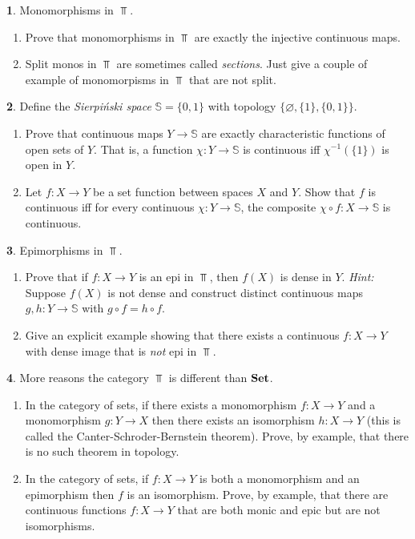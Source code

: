 \documentclass[11pt]{article}
\theoremstyle{definition}
\newtheorem{problem}{}
\newcommand{\bp}{\begin{problem}}
\newcommand{\ep}{\end{problem}\bigskip}
\theoremstyle{theorem}
\begin{document}
\begin{problem} Monomorphisms in $\Top$.
\begin{enumerate}[label=(\alph*)]
\item Prove that monomorphisms in $\Top$ are exactly the injective continuous maps.
\item Split monos in $\Top$ are sometimes called \emph{sections}.  Just give a couple of example  of monomorpisms in $\Top$ that are not split.
\end{enumerate}
\end{problem}

\bp Define the \emph{Sierpiński space} $\mathbb S=\{0,1\}$ with topology $\{\varnothing,\{1\},\{0,1\}\}$.  
\begin{enumerate}[label=(\alph*)]
\item Prove that continuous maps $Y\to\mathbb S$ are exactly characteristic functions of open sets of $Y$.  That is, a function $\chi:Y\to\mathbb S$ is continuous iff $\chi^{-1}(\{1\})$ is open in $Y$.
\item Let $f:X\to Y$ be a set function between spaces $X$ and $Y$. Show that $f$ is continuous iff for every continuous $\chi:Y\to\mathbb S$, the composite $\chi\circ f:X\to\mathbb S$ is continuous. 
\end{enumerate}
\ep 

\pagebreak

\begin{problem} Epimorphisms in $\Top$.
\begin{enumerate}[label=(\alph*)]
\item Prove that if $f:X\to Y$ is an epi in $\Top$, then $f(X)$ is dense in $Y$. \emph{Hint:} Suppose $f(X)$ is not dense and construct distinct continuous maps $g,h:Y\to\mathbb S$ with $g\circ f=h\circ f$.
\item Give an explicit example showing that there exists a continuous $f:X\to Y$ with dense image that is \emph{not} epi in $\Top$. 
\end{enumerate}
\end{problem}

\begin{problem}More reasons the category $\Top$ is different than $\mathbf{Set}$.
\begin{enumerate}[label=(\alph*)]
\item In the category of sets, if there exists a monomorphism $f:X \to Y$ and a monomorphism $g:Y \to X$ then there exists an isomorphism $h:X \to Y$ (this is called the Canter-Schroder-Bernstein theorem).  Prove, by example, that there is no such theorem in topology.
\item In the category of sets, if $f:X \to Y$ is both a monomorphism and an epimorphism then $f$ is an isomorphism.  Prove, by example, that there are continuous functions $f:X\to Y$ that are both monic and epic but are not isomorphisms.
\end{enumerate}
\end{problem}
\end{document}
